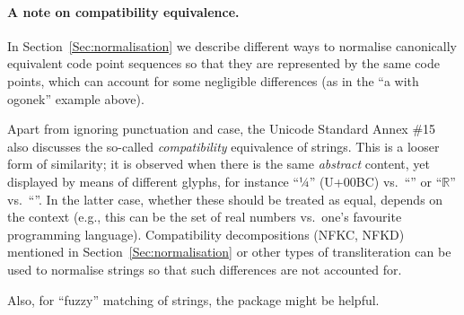 \documentclass[nojss]{jss}
\begin{document}





\paragraph{A note on compatibility equivalence.}
In Section~\ref{Sec:normalisation} we describe different ways to normalise
canonically equivalent code point sequences so that they are
represented by the same code points, which can account for some negligible
differences (as in the ``a with ogonek'' example above).

Apart from ignoring punctuation and case, the Unicode Standard Annex \#15 \citep{usa15:normalization}
also discusses the so-called \textit{compatibility} equivalence of strings.
This is a looser form of similarity; it is observed when
there is the same \textit{abstract} content, yet displayed
by means of different glyphs, for instance ``¼'' (U+00BC) vs.~``''
or ``$\mathbb{R}$'' vs.~``''.
In the latter case, whether these should be treated as equal,
depends on the context (e.g., this can be the set of real numbers
vs.~one's favourite programming language).
Compatibility decompositions (NFKC, NFKD)
mentioned in Section~\ref{Sec:normalisation}
or other types of transliteration can be used to normalise strings so that
such differences are not accounted for.

Also, for ``fuzzy'' matching of strings,
the  package \citep{stringdist} might be helpful.


\end{document}

